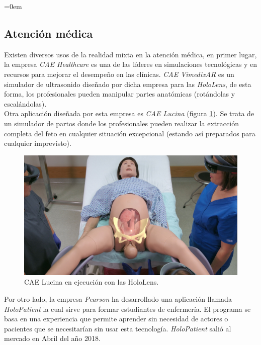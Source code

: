 \parindent=0em
\subsection{Atención médica}
\noindent


Existen diversos usos de la realidad mixta en la atención médica, en primer lugar, la empresa \textit{CAE Healthcare} es una de las líderes en simulaciones tecnológicas y en recursos para mejorar el desempeño en las clínicas. \textit{CAE VimedixAR} es un simulador de ultrasonido diseñado por dicha empresa para las \textit{HoloLens}, de esta forma, los profesionales pueden manipular partes anatómicas (rotándolas y escalándolas).\\

Otra aplicación diseñada por esta empresa es \textit{CAE Lucina} (figura \ref{fig:caelucina}). Se trata de un simulador de partos donde los profesionales pueden realizar la extracción completa del feto en cualquier situación excepcional (estando así preparados para cualquier imprevisto).

\begin{figure}[h]
    \centering
    \includegraphics[scale=0.38]{Images/Estado del arte/caehealthcareparto.jpg}
    \caption{CAE Lucina en ejecución con las HoloLens.}
    \label{fig:caelucina}
\end{figure}

Por otro lado, la empresa \textit{Pearson} ha desarrollado una aplicación llamada \textit{HoloPatient} la cual sirve para formar estudiantes de enfermería. El programa se basa en una experiencia que permite aprender sin necesidad de actores o pacientes que se necesitarían sin usar esta tecnología. \textit{HoloPatient} salió al mercado en Abril del año 2018.\\

